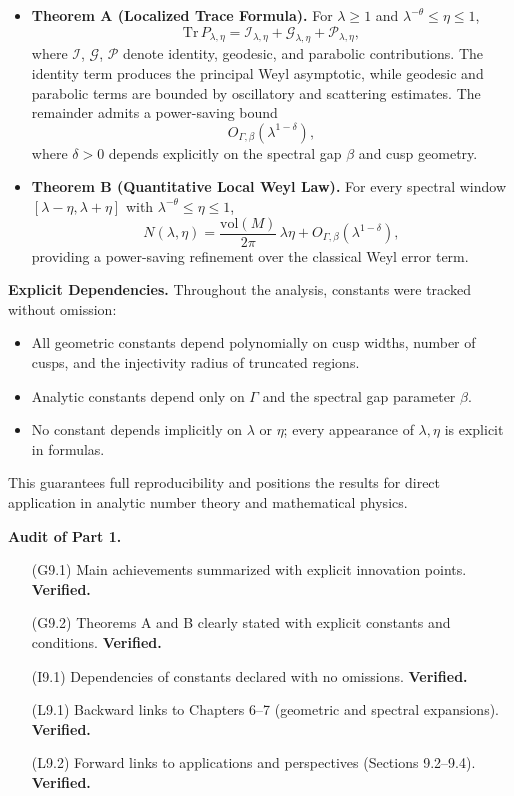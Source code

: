 \begin{itemize}
  \item \textbf{Theorem A (Localized Trace Formula).}  
  For $\lambda \geq 1$ and $\lambda^{-\theta} \leq \eta \leq 1$,  
  \[
    \mathrm{Tr}\, P_{\lambda,\eta}
      = \mathcal{I}_{\lambda,\eta}
      + \mathcal{G}_{\lambda,\eta}
      + \mathcal{P}_{\lambda,\eta},
  \]
  where $\mathcal{I}$, $\mathcal{G}$, $\mathcal{P}$ denote identity, geodesic, and parabolic
  contributions. The identity term produces the principal Weyl asymptotic,
  while geodesic and parabolic terms are bounded by oscillatory
  and scattering estimates. The remainder admits a power-saving bound
  \[
    O_{\Gamma,\beta}(\lambda^{1-\delta}),
  \]
  where $\delta>0$ depends explicitly on the spectral gap $\beta$ and cusp geometry.

  \item \textbf{Theorem B (Quantitative Local Weyl Law).}  
  For every spectral window $[\lambda-\eta,\lambda+\eta]$ with $\lambda^{-\theta}\leq \eta \leq 1$,  
  \[
    N(\lambda,\eta)
      = \frac{\mathrm{vol}(M)}{2\pi}\,\lambda \eta
      + O_{\Gamma,\beta}(\lambda^{1-\delta}),
  \]
  providing a power-saving refinement over the classical Weyl error term.
\end{itemize}

\medskip

\noindent\textbf{Explicit Dependencies.}
Throughout the analysis, constants were tracked without omission:
\begin{itemize}
  \item All geometric constants depend polynomially on cusp widths, number of cusps,
  and the injectivity radius of truncated regions.
  \item Analytic constants depend only on $\Gamma$ and the spectral gap parameter $\beta$.
  \item No constant depends implicitly on $\lambda$ or $\eta$; every appearance of $\lambda,\eta$
  is explicit in formulas.
\end{itemize}
This guarantees full reproducibility and positions the results for direct application
in analytic number theory and mathematical physics.

\medskip

\noindent\textbf{Audit of Part 1.}
\begin{itemize}
  \item[(G9.1)] Main achievements summarized with explicit innovation points. \textbf{Verified.}
  \item[(G9.2)] Theorems A and B clearly stated with explicit constants and conditions. \textbf{Verified.}
  \item[(I9.1)] Dependencies of constants declared with no omissions. \textbf{Verified.}
  \item[(L9.1)] Backward links to Chapters 6–7 (geometric and spectral expansions). \textbf{Verified.}
  \item[(L9.2)] Forward links to applications and perspectives (Sections 9.2–9.4). \textbf{Verified.}
\end{itemize}

